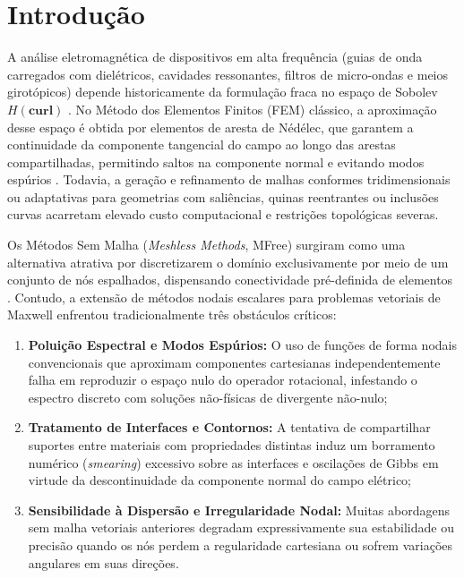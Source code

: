 \documentclass[11pt,a4paper]{article}
\begin{document}
\section{Introdu\c{c}\~ao}

A an\'alise eletromagn\'etica de dispositivos em alta frequ\^encia (guias de onda carregados com diel\'etricos, cavidades ressonantes, filtros de micro-ondas e meios girot\'opicos) depende historicamente da formula\c{c}\~ao fraca no espa\c{c}o de Sobolev $H(\mathbf{curl})$ \cite{harrington2001,collin1991}. No M\'etodo dos Elementos Finitos (FEM) cl\'assico, a aproxima\c{c}\~ao desse espa\c{c}o \'e obtida por elementos de aresta de N\'ed\'elec, que garantem a continuidade da componente tangencial do campo ao longo das arestas compartilhadas, permitindo saltos na componente normal e evitando modos esp\'urios \cite{jin2014}. Todavia, a gera\c{c}\~ao e refinamento de malhas conformes tridimensionais ou adaptativas para geometrias com sali\^encias, quinas reentrantes ou inclus\~oes curvas acarretam elevado custo computacional e restri\c{c}\~oes topol\'ogicas severas.

Os M\'etodos Sem Malha (\textit{Meshless Methods}, MFree) surgiram como uma alternativa atrativa por discretizarem o dom\'inio exclusivamente por meio de um conjunto de n\'os espalhados, dispensando conectividade pr\'e-definida de elementos \cite{belytschko1994}. Contudo, a extens\~ao de m\'etodos nodais escalares para problemas vetoriais de Maxwell enfrentou tradicionalmente tr\^es obst\'aculos cr\'iticos:
\begin{enumerate}
  \item \textbf{Polui\c{c}\~ao Espectral e Modos Esp\'urios:} O uso de fun\c{c}\~oes de forma nodais convencionais que aproximam componentes cartesianas independentemente falha em reproduzir o espa\c{c}o nulo do operador rotacional, infestando o espectro discreto com solu\c{c}\~oes n\~ao-f\'isicas de divergente n\~ao-nulo;
  \item \textbf{Tratamento de Interfaces e Contornos:} A tentativa de compartilhar suportes entre materiais com propriedades distintas induz um borramento num\'erico (\textit{smearing}) excessivo sobre as interfaces e oscila\c{c}\~oes de Gibbs em virtude da descontinuidade da componente normal do campo el\'etrico;
  \item \textbf{Sensibilidade \`a Dispers\~ao e Irregularidade Nodal:} Muitas abordagens sem malha vetoriais anteriores degradam expressivamente sua estabilidade ou precis\~ao quando os n\'os perdem a regularidade cartesiana ou sofrem varia\c{c}\~oes angulares em suas dire\c{c}\~oes.
\end{enumerate}
\end{document}

